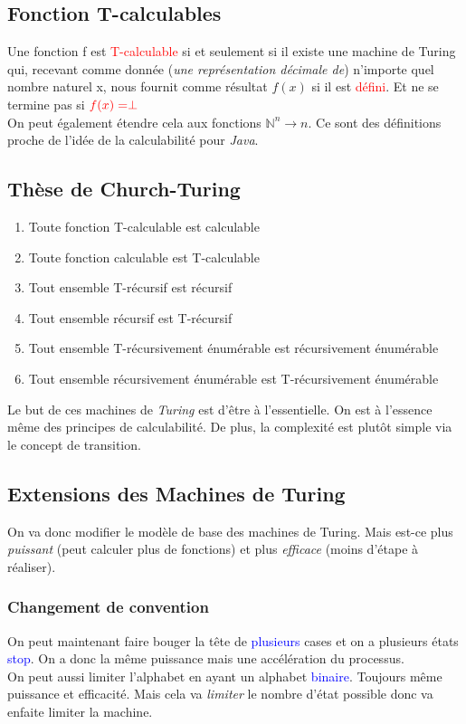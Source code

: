 \documentclass{report}
\begin{document}
\subsection{Fonction T-calculables}
Une fonction f est \textcolor{red}{T-calculable} si et seulement si il existe une machine de Turing qui, recevant comme donnée (\textit{une représentation décimale de}) n'importe quel nombre naturel x, nous fournit comme résultat $f(x)$ si il est \textcolor{red}{défini}. Et ne se termine pas si $\textcolor{red}{f(x) = \perp}$\\
On peut également étendre cela aux fonctions $\mathbb{N}^n \rightarrow n$. Ce sont des définitions proche de l'idée de la calculabilité pour \textit{Java}.

\subsection{Thèse de Church-Turing}
\begin{enumerate}
\item Toute fonction T-calculable est calculable
\item Toute fonction calculable est T-calculable
\item Tout ensemble T-récursif est récursif
\item Tout ensemble récursif est T-récursif
\item Tout ensemble T-récursivement énumérable est récursivement énumérable
\item Tout ensemble récursivement énumérable est T-récursivement énumérable
\end{enumerate}
Le but de ces machines de \textit{Turing} est d'être à l'essentielle. On est à l'essence même des principes de calculabilité. De plus, la complexité est plutôt simple via le concept de transition.

\subsection{Extensions des Machines de Turing}
On va donc modifier le modèle de base des machines de Turing. Mais est-ce plus \textit{puissant} (peut calculer plus de fonctions) et plus \textit{efficace} (moins d'étape à réaliser).

\subsubsection{Changement de convention}
On peut maintenant faire bouger la tête de \textcolor{blue}{plusieurs} cases et on a plusieurs états \textcolor{blue}{stop}. On a donc la même puissance mais une accélération du processus.\\
On peut aussi limiter l'alphabet en ayant un alphabet \textcolor{blue}{binaire}. Toujours même puissance et efficacité. Mais cela va \textit{limiter} le nombre d'état possible donc va enfaite limiter la machine.\\
\end{document}
